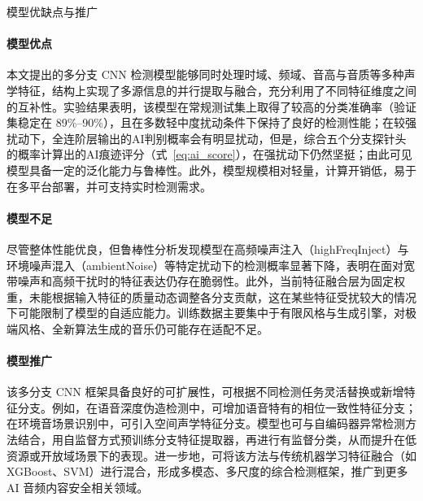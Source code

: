 \documentclass[aspectratio=169]{beamer}
\begin{document}
\begin{frame}{模型优缺点与推广}
\small
\paragraph{模型优点} 
本文提出的多分支 CNN 检测模型能够同时处理时域、频域、音高与音质等多种声学特征，结构上实现了多源信息的并行提取与融合，充分利用了不同特征维度之间的互补性。实验结果表明，该模型在常规测试集上取得了较高的分类准确率（验证集稳定在 89\%--90\%），且在多数轻中度扰动条件下保持了良好的检测性能；在较强扰动下，全连阶层输出的AI判别概率会有明显扰动，但是，综合五个分支探针头的概率计算出的AI痕迹评分（式~\ref{eq:ai_score}），在强扰动下仍然坚挺；由此可见模型具备一定的泛化能力与鲁棒性。此外，模型规模相对轻量，计算开销低，易于在多平台部署，并可支持实时检测需求。

\paragraph{模型不足} 
尽管整体性能优良，但鲁棒性分析发现模型在高频噪声注入（highFreqInject）与环境噪声混入（ambientNoise）等特定扰动下的检测概率显著下降，表明在面对宽带噪声和高频干扰时的特征表达仍存在脆弱性。此外，当前特征融合层为固定权重，未能根据输入特征的质量动态调整各分支贡献，这在某些特征受扰较大的情况下可能限制了模型的自适应能力。训练数据主要集中于有限风格与生成引擎，对极端风格、全新算法生成的音乐仍可能存在适配不足。

\paragraph{模型推广} 
该多分支 CNN 框架具备良好的可扩展性，可根据不同检测任务灵活替换或新增特征分支。例如，在语音深度伪造检测中，可增加语音特有的相位一致性特征分支；在环境音场景识别中，可引入空间声学特征分支。模型也可与自编码器异常检测方法结合，用自监督方式预训练分支特征提取器，再进行有监督分类，从而提升在低资源或开放域场景下的表现。进一步地，可将该方法与传统机器学习特征融合（如 XGBoost、SVM）进行混合，形成多模态、多尺度的综合检测框架，推广到更多 AI 音频内容安全相关领域。

\appendix
\end{frame}
\end{document}

